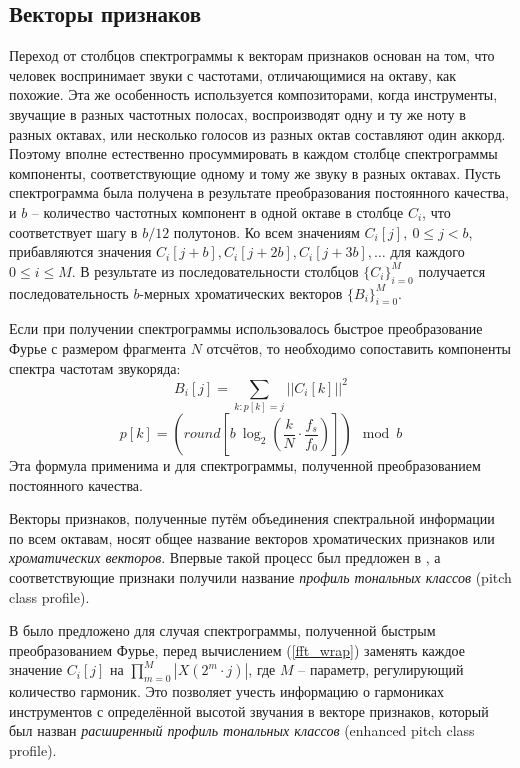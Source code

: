 \subsection{Векторы признаков} \label{ssectT_feat}

Переход от столбцов спектрограммы к векторам признаков основан на том, что
человек воспринимает звуки с частотами, отличающимися на октаву, как похожие.
Эта же особенность используется композиторами, когда инструменты, звучащие в
разных частотных полосах, воспроизводят одну и ту же ноту в разных октавах, или
несколько голосов из разных октав составляют один аккорд. Поэтому вполне
естественно просуммировать в каждом столбце спектрограммы компоненты,
соответствующие одному и тому же звуку в разных октавах. Пусть спектрограмма
была получена в результате преобразования постоянного качества, и $b$ --
количество частотных компонент в одной октаве в столбце $C_i$, что
соответствует шагу в $b/12$ полутонов. Ко всем значениям $C_i[j], ~ 0 \leq j <
b$, прибавляются значения $C_i[j+b], C_i[j+2b], C_i[j+3b], \ldots$ для каждого
$0 \leq i \leq M$. В результате из последовательности столбцов $\{C_i\}_{i=0}^M$
получается последовательность $b$-мерных хроматических векторов
$\{B_i\}_{i=0}^M$.

Если при получении спектрограммы использовалось быстрое преобразование Фурье с
размером фрагмента $N$ отсчётов, то необходимо сопоставить компоненты спектра
частотам звукоряда:
\begin{equation}
B_i[j] = \sum_{k: p[k]=j} ||C_i[k]||^2 \label{fft_wrap}
\end{equation}
$$p[k] = \left(round \left[ b~\log_2 \left( \frac{k}{N} \cdot \frac{f_s}{f_0}
\right) \right] \right) \mod b$$
Эта формула применима и для спектрограммы, полученной преобразованием
постоянного качества.

Векторы признаков, полученные путём объединения спектральной информации по всем
октавам, носят общее название векторов хроматических признаков или
\emph{хроматических векторов}. Впервые такой процесс был предложен в
\cite{Fujishima1999}, а соответствующие признаки получили название
\emph{профиль тональных классов} (pitch class profile).

В \cite{Lee2006} было предложено для случая спектрограммы, полученной быстрым
преобразованием Фурье, перед вычислением (\ref{fft_wrap}) заменять каждое
значение $C_i[j]$ на $\prod_{m=0}^M |X(2^m \cdot j)|$, где $M$ -- параметр,
регулирующий количество гармоник. Это позволяет учесть информацию о гармониках
инструментов с определённой высотой звучания в векторе признаков, который был
назван \emph{расширенный профиль тональных классов} (enhanced pitch class
profile).

